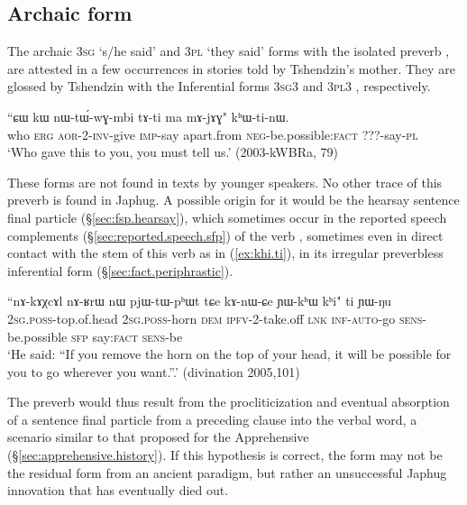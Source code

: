\subsection{Archaic form} \label{sec:khWti}
The archaic \textsc{3sg}  `s/he said' and \textsc{3pl}  `they said' forms with the isolated preverb , are attested in a few occurrences in stories told by Tshendzin's mother. They are glossed by Tshendzin with the Inferential forms \textsc{3sg}\fl{}3  and \textsc{3pl}\fl{}3 , respectively. 

\begin{exe}
\ex \label{ex:khWtinW}
\gll ``ɕɯ kɯ nɯ-tɯ́-wɣ-mbi tɤ-ti ma mɤ-jɤɣ" kʰɯ-ti-nɯ. \\
who \textsc{erg} \textsc{aor}-2-\textsc{inv}-give \textsc{imp}-say apart.from \textsc{neg}-be.possible:\textsc{fact} ???-say-\textsc{pl} \\
\glt `Who gave this to you, you must tell us.' (2003-kWBRa, 79)
\end{exe}

These forms are not found in texts by younger speakers. No other trace of this preverb is found in Japhug. A possible origin for it would be the hearsay sentence final particle  (§\ref{sec:fsp.hearsay}), which sometimes occur in the reported speech complements (§\ref{sec:reported.speech.sfp}) of the verb , sometimes even in direct contact with the stem of this verb as in (\ref{ex:khi.ti}), in its irregular preverbless inferential form (§\ref{sec:fact.periphrastic}).

\begin{exe}
\ex \label{ex:khi.ti}
 \gll ``nɤ-kɤχcɤl nɤ-ʁrɯ nɯ pjɯ-tɯ-pʰɯt tɕe kɤ-nɯ-ɕe ɲɯ-kʰɯ kʰi" ti ɲɯ-ŋu\\
 \textsc{2sg}.\textsc{poss}-top.of.head \textsc{2sg}.\textsc{poss}-horn \textsc{dem} \textsc{ipfv}-2-take.off \textsc{lnk} \textsc{inf}-\textsc{auto}-go \textsc{sens}-be.possible \textsc{sfp} say:\textsc{fact} \textsc{sens}-be \\
 \glt `He said: ``If you remove the horn on the top of your head, it will be possible for you to go wherever you want.''.' (divination 2005,101)
\end{exe}

The preverb  would thus result from the procliticization and eventual absorption of a sentence final particle from a preceding clause into the verbal word, a scenario similar to that proposed for the Apprehensive  (§\ref{sec:apprehensive.history}). If this hypothesis is correct, the form  may not be the residual form from an ancient paradigm, but rather an unsuccessful Japhug innovation that has eventually died out.

